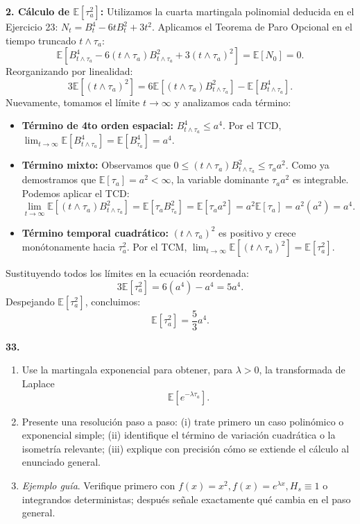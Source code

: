\documentclass[11pt, letterpaper]{article}
\begin{document}
\begin{solucion}
    \textbf{2. Cálculo de $\mathbb{E}[\tau_a^2]$:}
    Utilizamos la cuarta martingala polinomial deducida en el Ejercicio 23: $N_t = B_t^4 - 6tB_t^2 + 3t^2$.
    Aplicamos el Teorema de Paro Opcional en el tiempo truncado $t \wedge \tau_a$:
    \[ \mathbb{E}[B_{t \wedge \tau_a}^4 - 6(t \wedge \tau_a)B_{t \wedge \tau_a}^2 + 3(t \wedge \tau_a)^2] = \mathbb{E}[N_0] = 0. \]
    Reorganizando por linealidad:
    \[ 3\mathbb{E}[(t \wedge \tau_a)^2] = 6\mathbb{E}[(t \wedge \tau_a)B_{t \wedge \tau_a}^2] - \mathbb{E}[B_{t \wedge \tau_a}^4]. \]
    Nuevamente, tomamos el límite $t \to \infty$ y analizamos cada término:
    \begin{itemize}
        \item \textbf{Término de 4to orden espacial:} $B_{t \wedge \tau_a}^4 \le a^4$. Por el TCD, $\lim_{t \to \infty} \mathbb{E}[B_{t \wedge \tau_a}^4] = \mathbb{E}[B_{\tau_a}^4] = a^4$.
        \item \textbf{Término mixto:} Observamos que $0 \le (t \wedge \tau_a)B_{t \wedge \tau_a}^2 \le \tau_a a^2$. Como ya demostramos que $\mathbb{E}[\tau_a] = a^2 < \infty$, la variable dominante $\tau_a a^2$ es integrable. Podemos aplicar el TCD: 
        \[ \lim_{t \to \infty} \mathbb{E}[(t \wedge \tau_a)B_{t \wedge \tau_a}^2] = \mathbb{E}[\tau_a B_{\tau_a}^2] = \mathbb{E}[\tau_a a^2] = a^2 \mathbb{E}[\tau_a] = a^2 (a^2) = a^4. \]
        \item \textbf{Término temporal cuadrático:} $(t \wedge \tau_a)^2$ es positivo y crece monótonamente hacia $\tau_a^2$. Por el TCM, $\lim_{t \to \infty} \mathbb{E}[(t \wedge \tau_a)^2] = \mathbb{E}[\tau_a^2]$.
    \end{itemize}
    Sustituyendo todos los límites en la ecuación reordenada:
    \[ 3\mathbb{E}[\tau_a^2] = 6(a^4) - a^4 = 5a^4. \]
    Despejando $\mathbb{E}[\tau_a^2]$, concluimos:
    \[ \mathbb{E}[\tau_a^2] = \frac{5}{3}a^4. \]
\end{solucion}

\newpage

\begin{ejercicio}
    \textbf{33.} 
    \begin{enumerate}
        \item Use la martingala exponencial para obtener, para $\lambda > 0$, la transformada de Laplace
        \[ \mathbb{E}[e^{-\lambda \tau_a}]. \]
        \item Presente una resolución paso a paso: (i) trate primero un caso polinómico o exponencial simple; (ii) identifique el término de variación cuadrática o la isometría relevante; (iii) explique con precisión cómo se extiende el cálculo al enunciado general.
        \item \textit{Ejemplo guía}. Verifique primero con $f(x) = x^2, f(x) = e^{\lambda x}, H_s \equiv 1$ o integrandos deterministas; después señale exactamente qué cambia en el paso general.
    \end{enumerate}
\end{ejercicio}
\end{document}
